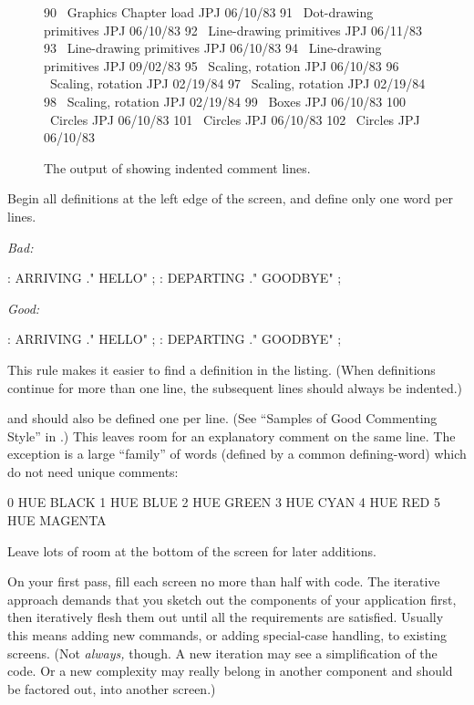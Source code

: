 \begin{figure*}[bbbb]
\caption{The output of  showing indented comment lines.}
\begin{Code}
 90 \ Graphics           Chapter load               JPJ 06/10/83
 91    \ Dot-drawing primitives                     JPJ 06/10/83
 92 \ Line-drawing primitives                       JPJ 06/11/83
 93    \ Line-drawing primitives                    JPJ 06/10/83
 94    \ Line-drawing primitives                    JPJ 09/02/83
 95 \ Scaling, rotation                             JPJ 06/10/83
 96    \ Scaling, rotation                          JPJ 02/19/84
 97    \ Scaling, rotation                          JPJ 02/19/84
 98    \ Scaling, rotation                          JPJ 02/19/84
 99 \ Boxes                                         JPJ 06/10/83
100 \ Circles                                       JPJ 06/10/83
101    \ Circles                                    JPJ 06/10/83
102    \ Circles                                    JPJ 06/10/83
\end{Code}
\end{figure*}

\begin{tip}
Begin all definitions at the left edge of the screen, and define only
one word per lines.
\end{tip}
\noindent \emph{Bad:}
\begin{Code}
: ARRIVING   ." HELLO" ;   : DEPARTING   ." GOODBYE" ;
\end{Code}
\noindent \emph{Good:}
\begin{Code}
: ARRIVING   ." HELLO" ;
: DEPARTING   ." GOODBYE" ;
\end{Code}
This rule makes it easier to find a definition in the listing.  (When
definitions continue for more than one line, the subsequent lines
should always be indented.)

 and  should also be defined one per
line.  (See ``Samples of Good Commenting Style'' in .) This
leaves room for an explanatory comment on the same line.  The
exception is a large ``family'' of words (defined by a common
defining-word) which do not need unique comments:
\begin{Code}
0 HUE BLACK     1 HUE BLUE      2 HUE GREEN
3 HUE CYAN      4 HUE RED       5 HUE MAGENTA
\end{Code}
\begin{tip}
Leave lots of room at the bottom of the screen for later additions.
\end{tip}
On your first pass, fill each screen no more than half with code.  The
iterative approach demands that you sketch out the components of your
application first, then iteratively flesh them out until all the
requirements are satisfied.  Usually this means adding new commands,
or adding special-case handling, to existing screens.  (Not
\emph{always,} though.  A new iteration may see a simplification of
the code. Or a new complexity may really belong in another component
and should be factored out, into another screen.)

